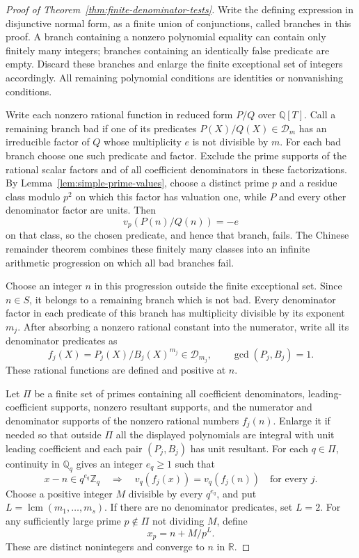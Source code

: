 \begin{proof}[Proof of Theorem~\ref{thm:finite-denominator-tests}]
Write the defining expression in disjunctive normal form, as a finite
union of conjunctions, called branches in this proof.  A branch
containing a nonzero polynomial equality can contain only finitely
many integers; branches containing an identically false predicate
are empty.  Discard these branches and enlarge the finite exceptional
set of integers accordingly.  All remaining polynomial conditions
are identities or nonvanishing conditions.

Write each nonzero rational function in reduced form $P/Q$ over
$\mathbb Q[T]$.  Call a remaining branch bad if one of its predicates
$P(X)/Q(X)\in\mathcal D_m$ has an irreducible factor of $Q$ whose
multiplicity $e$ is not divisible by $m$.  For each bad branch choose
one such predicate and factor.  Exclude the prime supports of the
rational scalar factors and of all coefficient denominators in these
factorizations.  By
Lemma~\ref{lem:simple-prime-values}, choose a distinct prime $p$ and
a residue class modulo $p^2$ on which this factor has valuation one,
while $P$ and every other denominator factor are units.  Then
\[
                         v_p(P(n)/Q(n))=-e
\]
on that class, so the chosen predicate, and hence that branch, fails.
The Chinese remainder theorem combines these finitely many classes
into an infinite arithmetic progression on which all bad branches
fail.

Choose an integer $n$ in this progression outside the finite
exceptional set.  Since $n\in S$, it belongs to a remaining branch
which is not bad.  Every denominator factor in each predicate of
this branch has multiplicity divisible by its exponent $m_j$.
After absorbing a nonzero rational constant into the numerator,
write all its denominator predicates as
\[
              f_j(X)=P_j(X)/B_j(X)^{m_j}\in\mathcal D_{m_j},
              \qquad\gcd(P_j,B_j)=1.
\]
These rational functions are defined and positive at $n$.

Let $\Pi$ be a finite set of primes containing all coefficient
denominators, leading-coefficient supports, nonzero resultant
supports, and the numerator and denominator supports of the
nonzero rational numbers $f_j(n)$.  Enlarge it if needed so that
outside $\Pi$ all the displayed polynomials are integral with
unit leading coefficient and each pair $(P_j,B_j)$ has unit
resultant.  For each $q\in\Pi$, continuity in $\mathbb Q_q$
gives an integer $e_q\ge1$ such that
\[
 x-n\in q^{e_q}\mathbb Z_q
       \quad\Longrightarrow\quad
 v_q(f_j(x))=v_q(f_j(n))\quad\text{for every }j.
\]
Choose a positive integer $M$ divisible by every $q^{e_q}$,
and put $L=\operatorname{lcm}(m_1,\ldots,m_s)$.  If there are
no denominator predicates, set $L=2$.  For any sufficiently large
prime $p\notin\Pi$ not dividing $M$, define
\[
                              x_p=n+M/p^L.
\]
These are distinct nonintegers and converge to $n$ in $\mathbb R$.


\end{proof}
